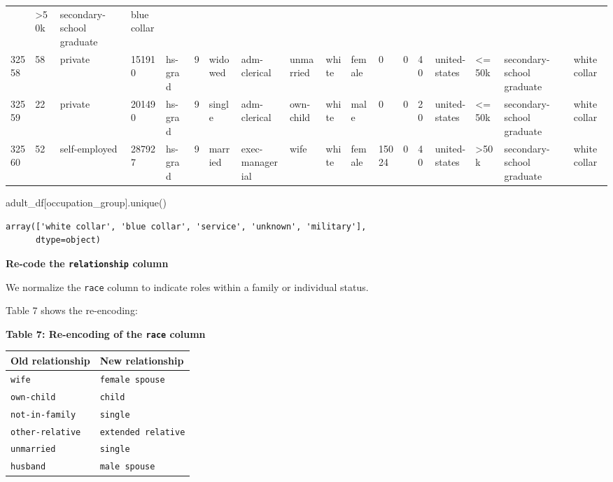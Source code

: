\documentclass[
  letterpaper,
  DIV=11,
  numbers=noendperiod]{scrartcl}
\newenvironment{Shaded}{\begin{snugshade}}{\end{snugshade}}
\newcommand{\NormalTok}[1]{\textcolor[rgb]{0.00,0.23,0.31}{#1}}
\newcommand{\StringTok}[1]{\textcolor[rgb]{0.13,0.47,0.30}{#1}}
\begin{document}
\begin{longtable}[]{@{}llllllllllllllllll@{}}
& \textgreater50k & secondary-school graduate & blue collar \\
32558 & 58 & private & 151910 & hs-grad & 9 & widowed & adm-clerical &
unmarried & white & female & 0 & 0 & 40 & united-states & \textless=50k
& secondary-school graduate & white collar \\
32559 & 22 & private & 201490 & hs-grad & 9 & single & adm-clerical &
own-child & white & male & 0 & 0 & 20 & united-states & \textless=50k &
secondary-school graduate & white collar \\
32560 & 52 & self-employed & 287927 & hs-grad & 9 & married &
exec-managerial & wife & white & female & 15024 & 0 & 40 & united-states
& \textgreater50k & secondary-school graduate & white collar \\
\end{longtable}

\begin{Shaded}
\begin{Highlighting}[]
\NormalTok{adult\_df[}\StringTok{\textquotesingle{}occupation\_group\textquotesingle{}}\NormalTok{].unique()}
\end{Highlighting}
\end{Shaded}

\begin{verbatim}
array(['white collar', 'blue collar', 'service', 'unknown', 'military'],
      dtype=object)
\end{verbatim}

\textbf{Re-code the \texttt{relationship} column}

We normalize the \texttt{race} column to indicate roles within a family
or individual status.

Table 7 shows the re-encoding:

\textbf{Table 7: Re-encoding of the \texttt{race} column}

\begin{longtable}[]{@{}ll@{}}
\toprule\noalign{}
Old relationship & New relationship \\
\midrule\noalign{}
\endhead
\bottomrule\noalign{}
\endlastfoot
\texttt{wife} & \texttt{female\ spouse} \\
\texttt{own-child} & \texttt{child} \\
\texttt{not-in-family} & \texttt{single} \\
\texttt{other-relative} & \texttt{extended\ relative} \\
\texttt{unmarried} & \texttt{single} \\
\texttt{husband} & \texttt{male\ spouse} \\
\end{longtable}
\end{document}
